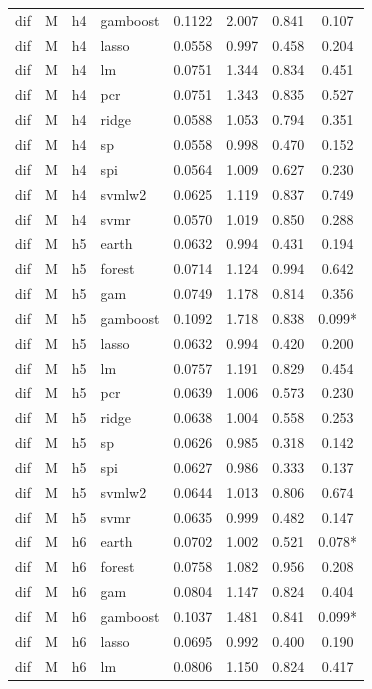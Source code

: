 \begin{ThreePartTable}
\begin{longtable}[t]{llclcccc}
dif & M & h4 & gamboost & 0.1122 & 2.007 & 0.841 & 0.107\\
dif & M & h4 & lasso & 0.0558 & 0.997 & 0.458 & 0.204\\
dif & M & h4 & lm & 0.0751 & 1.344 & 0.834 & 0.451\\
dif & M & h4 & pcr & 0.0751 & 1.343 & 0.835 & 0.527\\
dif & M & h4 & ridge & 0.0588 & 1.053 & 0.794 & 0.351\\
dif & M & h4 & sp & 0.0558 & 0.998 & 0.470 & 0.152\\
dif & M & h4 & spi & 0.0564 & 1.009 & 0.627 & 0.230\\
dif & M & h4 & svmlw2 & 0.0625 & 1.119 & 0.837 & 0.749\\
dif & M & h4 & svmr & 0.0570 & 1.019 & 0.850 & 0.288\\
\addlinespace
dif & M & h5 & earth & 0.0632 & 0.994 & 0.431 & 0.194\\
dif & M & h5 & forest & 0.0714 & 1.124 & 0.994 & 0.642\\
dif & M & h5 & gam & 0.0749 & 1.178 & 0.814 & 0.356\\
dif & M & h5 & gamboost & 0.1092 & 1.718 & 0.838 & 0.099*\\
dif & M & h5 & lasso & 0.0632 & 0.994 & 0.420 & 0.200\\
dif & M & h5 & lm & 0.0757 & 1.191 & 0.829 & 0.454\\
dif & M & h5 & pcr & 0.0639 & 1.006 & 0.573 & 0.230\\
dif & M & h5 & ridge & 0.0638 & 1.004 & 0.558 & 0.253\\
dif & M & h5 & sp & 0.0626 & 0.985 & 0.318 & 0.142\\
dif & M & h5 & spi & 0.0627 & 0.986 & 0.333 & 0.137\\
dif & M & h5 & svmlw2 & 0.0644 & 1.013 & 0.806 & 0.674\\
dif & M & h5 & svmr & 0.0635 & 0.999 & 0.482 & 0.147\\
\addlinespace
dif & M & h6 & earth & 0.0702 & 1.002 & 0.521 & 0.078*\\
dif & M & h6 & forest & 0.0758 & 1.082 & 0.956 & 0.208\\
dif & M & h6 & gam & 0.0804 & 1.147 & 0.824 & 0.404\\
dif & M & h6 & gamboost & 0.1037 & 1.481 & 0.841 & 0.099*\\
dif & M & h6 & lasso & 0.0695 & 0.992 & 0.400 & 0.190\\
dif & M & h6 & lm & 0.0806 & 1.150 & 0.824 & 0.417\\

\end{longtable}
\end{ThreePartTable}
